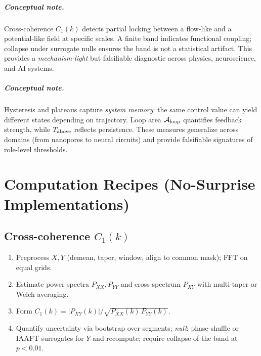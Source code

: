 \documentclass[12pt,a4paper,oneside]{scrreprt}
\begin{document}
\paragraph{Conceptual note.}
Cross-coherence $C_1(k)$ detects partial locking between a flow-like and a potential-like field at specific scales. A finite band indicates functional coupling; collapse under surrogate nulls ensures the band is not a statistical artifact. This provides a \emph{mechanism-light} but falsifiable diagnostic across physics, neuroscience, and AI systems.

\paragraph{Conceptual note.}
Hysteresis and plateaus capture \emph{system memory}: the same control value can yield different states depending on trajectory. Loop area $\mathcal A_{\rm loop}$ quantifies feedback strength, while $T_{\rm above}$ reflects persistence. These measures generalize across domains (from nanopores to neural circuits) and provide falsifiable signatures of role-level thresholds.

\chapter{Computation Recipes (No-Surprise Implementations)}\label{app:recipes}
\section*{Cross-coherence $C_1(k)$}
\begin{enumerate}
\item Preprocess $X,Y$ (demean, taper, window, align to common mask); FFT on equal grids.
\item Estimate power spectra $P_{XX},P_{YY}$ and cross-spectrum $P_{XY}$ with multi-taper or Welch averaging.
\item Form $C_1(k)=|P_{XY}(k)|/\sqrt{P_{XX}(k)\,P_{YY}(k)}$.
\item Quantify uncertainty via bootstrap over segments; \emph{null}: phase-shuffle or IAAFT surrogates for $Y$ and recompute; require collapse of the band at $p<0.01$.
\end{enumerate}
\end{document}
